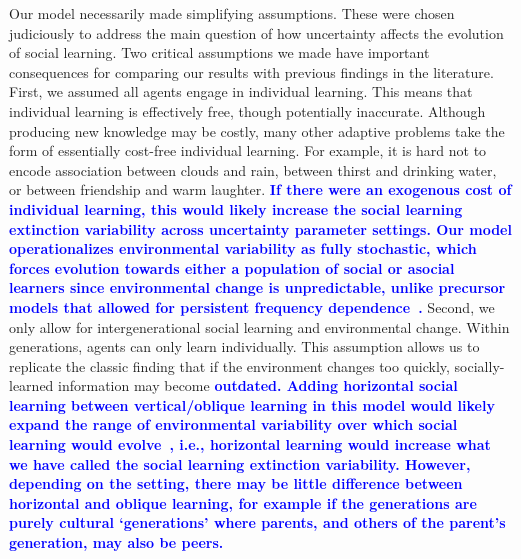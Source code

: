 \documentclass[letterpaper,11.5pt]{scrartcl}
\newcommand{\edit}[1]{{\bfseries \textcolor{blue} {#1}}}
\begin{document}
Our model necessarily made simplifying assumptions. These were chosen judiciously to
address the main question of how uncertainty affects the evolution of social
learning. Two critical assumptions we made have important consequences for comparing
our results with previous findings in the literature. First, we assumed all agents
engage in individual learning. This means that individual learning is effectively
free, though potentially inaccurate. Although producing new knowledge may be costly,
many other adaptive problems take the form of essentially cost-free individual
learning. For example, it is hard not to encode association between clouds and rain,
between thirst and drinking water, or between friendship and warm laughter.
\edit{If there were an exogenous cost of individual learning, this would likely increase the social learning extinction variability across uncertainty parameter settings.
Our model operationalizes environmental variability as fully stochastic,
which forces evolution towards either a population of social or asocial learners
since environmental change is unpredictable, unlike precursor
models that allowed for persistent frequency
dependence~\citep{BoydRicherson1985,Rogers1988,Feldman1996}.} Second, we only allow for
intergenerational social learning and environmental change. Within generations,
agents can only learn individually. This assumption allows us to replicate the
classic finding that if the environment changes too quickly, socially-learned
information may become \edit{outdated. Adding horizontal social learning between
vertical/oblique learning in this model would likely expand the range of
environmental variability over which social learning would
evolve~\citep{Turner2022}, i.e., horizontal learning would increase what we have
called the social learning extinction variability. However, depending on the
setting, there may be little difference between horizontal and oblique learning, for
example if the generations are purely cultural ‘generations’ where parents, and
others of the parent's generation, may also be peers.}
\end{document}
